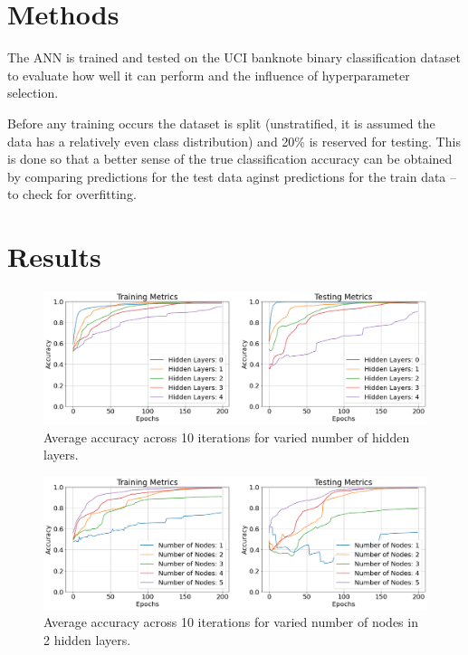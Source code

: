 \documentclass{article}
\begin{document}
\section{Methods}

The ANN is trained and tested on the UCI banknote binary
classification dataset to evaluate how well it can perform and the
influence of hyperparameter selection.

Before any training occurs the dataset is split (unstratified, it is
assumed the data has a relatively even class distribution) and 20\%
is reserved for testing. This is done so that a better sense of the
true classification accuracy can be obtained by comparing predictions
for the test data aginst predictions for the train data -- to check for
overfitting.


\section{Results}


\begin{figure}[H]
  \centering
  \includegraphics[width=\textwidth]{figs/layers.png}
  \caption{
    Average accuracy across 10 iterations for varied number of hidden
    layers.
  }
  \label{fig:layers}
\end{figure}

\begin{figure}[H]
  \centering
  \includegraphics[width=\textwidth]{figs/nodes.png}
  \caption{
    Average accuracy across 10 iterations for varied number of nodes
    in 2 hidden layers.
  }
  \label{fig:nodes}
\end{figure}
\end{document}
